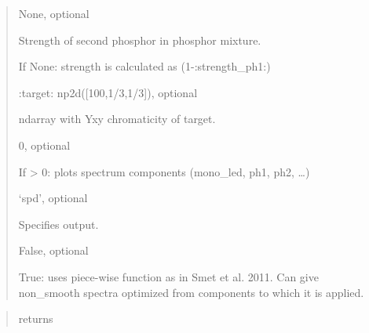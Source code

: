\documentclass[letterpaper,10pt,english]{sphinxmanual}
\begin{document}
\begin{fulllineitems}
\begin{description}
\begin{quote}
\begin{description}
\item[{strength\_ph2}] \leavevmode
\begin{DUlineblock}{0em}
\item[] None, optional
\item[] Strength of second phosphor in phosphor mixture. 
\item[] If None: strength is calculated as (1-:strength\_ph1:)
\item[]
\begin{DUlineblock}{\DUlineblockindent}
\item[]
\begin{DUlineblock}{\DUlineblockindent}
\item[] :target: np2d({[}100,1/3,1/3{]}), optional
\end{DUlineblock}
\item[] ndarray with Yxy chromaticity of target.
\end{DUlineblock}
\end{DUlineblock}

\item[{verbosity}] \leavevmode
\begin{DUlineblock}{0em}
\item[] 0, optional
\item[] If \textgreater{} 0: plots spectrum components (mono\_led, ph1, ph2, …)
\end{DUlineblock}

\item[{out}] \leavevmode
\begin{DUlineblock}{0em}
\item[] ‘spd’, optional
\item[] Specifies output.
\end{DUlineblock}

\item[{use\_piecewise\_fcn}] \leavevmode
\begin{DUlineblock}{0em}
\item[] False, optional
\item[] True: uses piece-wise function as in Smet et al. 2011. Can give 
non\_smooth spectra optimized from components to which it is
applied. 
\end{DUlineblock}

\end{description}\end{quote}

\item[{Returns:}] \leavevmode\begin{quote}\begin{description}
\item[{returns}] \leavevmode
{}


\end{description}
\end{quote}
\end{description}
\end{fulllineitems}
\end{document}
